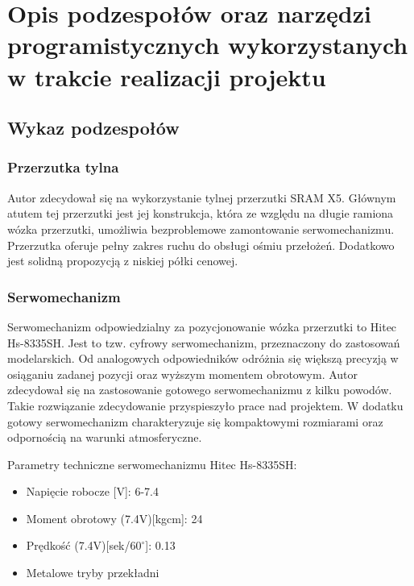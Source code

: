 \chapter{Opis podzespołów oraz narzędzi programistycznych wykorzystanych w trakcie realizacji projektu}
\section{Wykaz podzespołów}
\subsection{Przerzutka tylna}
Autor zdecydował się na wykorzystanie tylnej przerzutki SRAM X5. Głównym atutem tej przerzutki jest jej konstrukcja, która ze względu na długie ramiona wózka przerzutki, umożliwia bezproblemowe zamontowanie serwomechanizmu. Przerzutka oferuje pełny zakres ruchu do obsługi ośmiu przełożeń. Dodatkowo jest solidną propozycją z niskiej półki cenowej.
\subsection{Serwomechanizm}
Serwomechanizm odpowiedzialny za pozycjonowanie wózka przerzutki to Hitec Hs-8335SH. Jest to tzw. cyfrowy serwomechanizm, przeznaczony do zastosowań modelarskich. Od analogowych odpowiedników odróżnia się większą precyzją w osiąganiu zadanej pozycji oraz wyższym momentem obrotowym. Autor zdecydował się na zastosowanie gotowego serwomechanizmu z kilku powodów. Takie rozwiązanie zdecydowanie przyspieszyło prace nad projektem. W dodatku gotowy serwomechanizm charakteryzuje się kompaktowymi rozmiarami oraz odpornością na warunki atmosferyczne.  

Parametry techniczne serwomechanizmu Hitec Hs-8335SH:
\begin{itemize}
\item
Napięcie robocze [V]: 6-7.4
\item
Moment obrotowy (7.4V)[kgcm]: 24
\item
Prędkość (7.4V)[sek/$60^{\circ}$]: 0.13
\item
Metalowe tryby przekładni
\end{itemize} 
\label{serwo}
